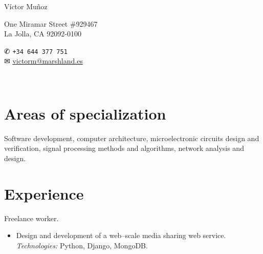 \documentclass[11pt]{article}
\newcommand{\years}[1]{\marginnote{\scriptsize #1}}
\begin{document}
\begin{minipage}[m]{.3\textwidth}
	{\LARGE Víctor Muñoz}
\end{minipage}
\begin{minipage}[m]{.35\textwidth}
	One Miramar Street \#929467\\
	La Jolla, CA 92092-0100
\end{minipage}
\begin{minipage}[m]{.3\textwidth}
	{\dingbats ✆} \texttt{+34 644 377 751}\\
	{\dingbats ✉} \href{mailto:victorm@marshland.es}
	                    {victorm@marshland.es}
\end{minipage}\\[0.2cm]


\section*{Areas of specialization} %
Software development, computer architecture,  microelectronic circuits design and verification, signal processing methods and algorithms, network analysis and design.


\section*{Experience}  %
\noindent
\years{2012--present}Freelance worker.
\begin{itemize}
	\item  Design and development of a web--scale media sharing web service.\\
	\textit{Technologies:} Python, Django, MongoDB.
\end{itemize}
\end{document}
